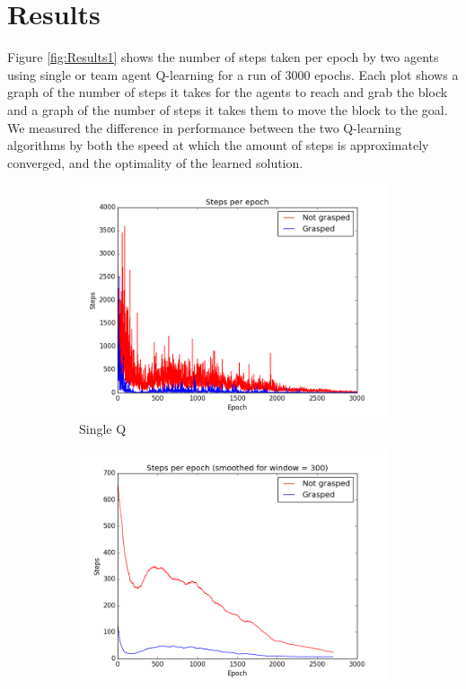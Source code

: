\section{Results}
Figure \ref{fig:Results1} shows the number of steps taken per epoch by two agents using single or team agent Q-learning for a run of 3000 epochs. Each plot shows a graph of the number of steps it takes for the agents to reach and grab the block and a graph of the number of steps it takes them to move the block to the goal. We measured the difference in performance between the two Q-learning algorithms by both the speed at which the amount of steps is approximately converged, and the optimality of the learned solution. 

\begin{figure}
	\centering
	\begin{subfigure}{.48\textwidth}
		\centering
		\includegraphics[width=\textwidth]{images/SingleQ.png}
		\caption{Single Q}
	\end{subfigure}
	\begin{subfigure}{0.48\textwidth}
		\centering
		\includegraphics[width=\textwidth]{images/SingleQ_smoothed.png}

\end{subfigure}
\end{figure}
